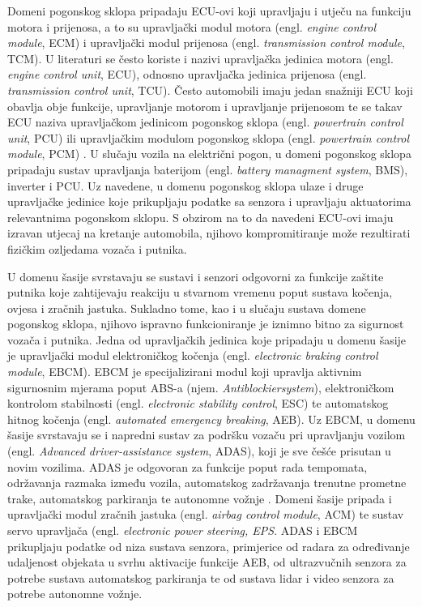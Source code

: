\documentclass[times, utf8, diplomski, numeric]{fer}
\begin{document}
Domeni pogonskog sklopa pripadaju ECU-ovi koji upravljaju i utječu na funkciju motora i prijenosa, a to su upravljački modul motora (engl. \textit{engine control module}, ECM) i upravljački modul prijenosa (engl. \textit{transmission control module}, TCM). U literaturi se često koriste i nazivi upravljačka jedinica motora (engl. \textit{engine control unit}, ECU), odnosno upravljačka jedinica prijenosa (engl. \textit{transmission control unit}, TCU)\cite{nasser2023automotive, koscher2010}. Često automobili imaju jedan snažniji ECU koji obavlja obje funkcije, upravljanje motorom i upravljanje prijenosom te se takav ECU naziva upravljačkom jedinicom pogonskog sklopa (engl. \textit{powertrain control unit}, PCU) ili upravljačkim modulom pogonskog sklopa (engl. \textit{powertrain control module}, PCM) \cite{bosch2022handbook, ecutesting}. U slučaju vozila na električni pogon, u domeni pogonskog sklopa pripadaju sustav upravljanja baterijom (engl. \textit{battery managment system}, BMS), inverter  i PCU. Uz navedene, u domenu pogonskog sklopa ulaze i druge upravljačke jedinice koje prikupljaju podatke sa senzora i upravljaju aktuatorima relevantnima pogonskom sklopu. S obzirom na to da navedeni ECU-ovi imaju izravan utjecaj na kretanje automobila, njihovo kompromitiranje može rezultirati fizičkim ozljedama vozača i putnika.

U domenu šasije svrstavaju se sustavi i senzori odgovorni za funkcije zaštite putnika koje zahtijevaju reakciju u stvarnom vremenu poput sustava kočenja, ovjesa i zračnih jastuka. Sukladno tome, kao i u slučaju sustava domene pogonskog sklopa, njihovo ispravno funkcioniranje je iznimno bitno za sigurnost vozača i putnika\cite{nasser2023automotive}. Jedna od upravljačkih jedinica koje pripadaju u domenu šasije je upravljački modul elektroničkog kočenja (engl. \textit{electronic braking control module}, EBCM). EBCM je specijalizirani modul koji upravlja aktivnim sigurnosnim mjerama poput ABS-a (njem. \textit{Antiblockiersystem}), elektroničkom kontrolom stabilnosti (engl. \textit{electronic stability control}, ESC) te automatskog hitnog kočenja (engl. \textit{automated emergency breaking}, AEB). Uz EBCM, u domenu šasije svrstavaju se i napredni sustav za podršku vozaču pri upravljanju vozilom (engl. \textit{Advanced driver-assistance system}, ADAS), koji je sve češće prisutan u novim vozilima\cite{nasser2023automotive}. ADAS je odgovoran za funkcije poput rada tempomata, održavanja razmaka između vozila,  automatskog zadržavanja trenutne prometne trake, automatskog parkiranja te autonomne vožnje \cite{bosch2022handbook}. Domeni šasije pripada i upravljački modul zračnih jastuka (engl. \textit{airbag control module}, ACM) te sustav servo upravljača (engl. \textit{electronic power steering, EPS}. ADAS i EBCM prikupljaju podatke od niza sustava senzora, primjerice od radara za određivanje udaljenost objekata u svrhu aktivacije funkcije AEB, od ultrazvučnih senzora za potrebe sustava automatskog parkiranja te od sustava lidar i video senzora za potrebe autonomne vožnje. 
\end{document}
